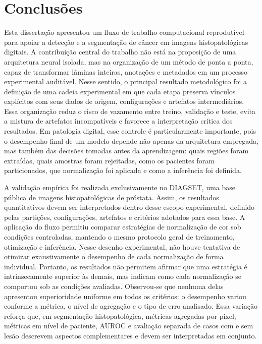 \chapter{Conclusões}\label{chp:conclusoes} 

Esta dissertação apresentou um fluxo de trabalho computacional reprodutível para apoiar a detecção e a segmentação de câncer em imagens histopatológicas digitais. A contribuição central do trabalho não está na proposição de uma arquitetura neural isolada, mas na organização de um método de ponta a ponta, capaz de transformar lâminas inteiras, anotações e metadados em um processo experimental auditável. Nesse sentido, o principal resultado metodológico foi a definição de uma cadeia experimental em que cada etapa preserva vínculos explícitos com seus dados de origem, configurações e artefatos intermediários. Essa organização reduz o risco de vazamento entre treino, validação e teste, evita a mistura de artefatos incompatíveis e favorece a interpretação crítica dos resultados. Em patologia digital, esse controle é particularmente importante, pois o desempenho final de um modelo depende não apenas da arquitetura empregada, mas também das decisões tomadas antes da aprendizagem: quais regiões foram extraídas, quais amostras foram rejeitadas, como os pacientes foram particionados, que normalização foi aplicada e como a inferência foi definida. 

A validação empírica foi realizada exclusivamente no DIAGSET, uma base pública de imagens histopatológicas de próstata. Assim, os resultados quantitativos devem ser interpretados dentro desse escopo experimental, definido pelas partições, configurações, artefatos e critérios adotados para essa base. A aplicação do fluxo permitiu comparar estratégias de normalização de cor sob condições controladas, mantendo o mesmo protocolo geral de treinamento, otimização e inferência. Nesse desenho experimental, não houve tentativa de otimizar exaustivamente o desempenho de cada normalização de forma individual. Portanto, os resultados não permitem afirmar que uma estratégia é intrinsecamente superior às demais, mas indicam como cada normalização se comportou sob as condições avaliadas. Observou-se que nenhuma delas apresentou superioridade uniforme em todos os critérios: o desempenho variou conforme a métrica, o nível de agregação e o tipo de erro analisado. Essa variação reforça que, em segmentação histopatológica, métricas agregadas por pixel, métricas em nível de paciente, AUROC e avaliação separada de casos com e sem lesão descrevem aspectos complementares e devem ser interpretadas em conjunto.

